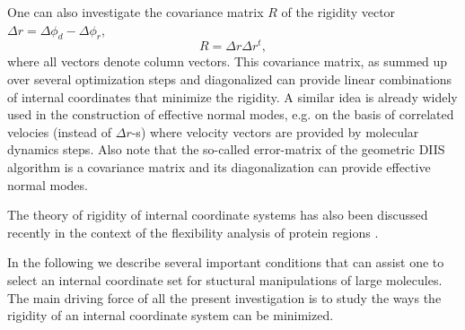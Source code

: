 \documentclass[prl,aps,preprint,superbib,12pt]{revtex4}
\begin{document}
One can also investigate the covariance matrix $R$
of the rigidity vector $\Delta r = \Delta \phi_{d} - \Delta \phi_{r}$,
\begin{equation}
R = \Delta r \Delta r^{t} ,
\end{equation}
where all vectors denote column vectors. This covariance matrix,
as summed up over several optimization steps and diagonalized 
can provide linear
combinations of internal coordinates that minimize the rigidity.
A similar idea \cite{MKarplus81,AStrachan04} 
is already widely used in the construction of 
effective normal modes, e.g. on the basis of correlated velocies
(instead of $\Delta r$-s) where velocity vectors
are provided by molecular dynamics steps. Also note that the so-called
error-matrix of the geometric DIIS algorithm \cite{PPulay84} is a 
covariance matrix and its diagonalization can provide effective
normal modes.

The theory of rigidity of internal coordinate systems has 
also been discussed recently in the context of the flexibility
analysis of protein regions \cite{AJRader02}.

In the following we describe several important conditions 
that can assist one to select an internal coordinate set 
for stuctural manipulations of large molecules.
The main driving force of all the present investigation is to study the
ways the rigidity of an internal coordinate system can be minimized.
\end{document}
